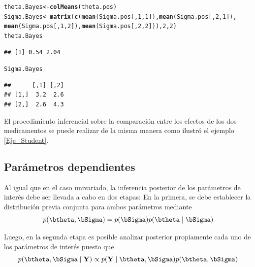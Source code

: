 \documentclass[10pt,openright]{book}\usepackage[]{graphicx}\usepackage[]{color}
\makeatletter
\newcommand{\hlnum}[1]{\textcolor[rgb]{0.686,0.059,0.569}{#1}}%
\newcommand{\hlstd}[1]{\textcolor[rgb]{0.345,0.345,0.345}{#1}}%
\newcommand{\hlkwb}[1]{\textcolor[rgb]{0.69,0.353,0.396}{#1}}%
\newcommand{\hlkwd}[1]{\textcolor[rgb]{0.737,0.353,0.396}{\textbf{#1}}}%
\newenvironment{kframe}{%
 \def\at@end@of@kframe{}%
 \ifinner\ifhmode%
  \def\at@end@of@kframe{\end{minipage}}%
  \begin{minipage}{\columnwidth}%
 \fi\fi%
 \def\FrameCommand##1{\hskip\@totalleftmargin \hskip-\fboxsep
 \colorbox{shadecolor}{##1}\hskip-\fboxsep
     \hskip-\linewidth \hskip-\@totalleftmargin \hskip\columnwidth}%
 \MakeFramed {\advance\hsize-\width
   \@totalleftmargin\z@ \linewidth\hsize
   \@setminipage}}%
 {\par\unskip\endMakeFramed%
 \at@end@of@kframe}
\newenvironment{knitrout}{}{} %
\makeatother
\begin{document}
\begin{Eje}
\begin{knitrout}
\color{fgcolor}\begin{kframe}
\begin{alltt}
\hlstd{theta.Bayes} \hlkwb{<-} \hlkwd{colMeans}\hlstd{(theta.pos)}
\hlstd{Sigma.Bayes} \hlkwb{<-} \hlkwd{matrix}\hlstd{(}\hlkwd{c}\hlstd{(}\hlkwd{mean}\hlstd{(Sigma.pos[,}\hlnum{1}\hlstd{,}\hlnum{1}\hlstd{]),} \hlkwd{mean}\hlstd{(Sigma.pos[,}\hlnum{2}\hlstd{,}\hlnum{1}\hlstd{]),}
                        \hlkwd{mean}\hlstd{(Sigma.pos[,}\hlnum{1}\hlstd{,}\hlnum{2}\hlstd{]),} \hlkwd{mean}\hlstd{(Sigma.pos[,}\hlnum{2}\hlstd{,}\hlnum{2}\hlstd{])),}\hlnum{2}\hlstd{,}\hlnum{2}\hlstd{)}
\hlstd{theta.Bayes}
\end{alltt}
\begin{verbatim}
## [1] 0.54 2.04
\end{verbatim}
\begin{alltt}
\hlstd{Sigma.Bayes}
\end{alltt}
\begin{verbatim}
##      [,1] [,2]
## [1,]  3.2  2.6
## [2,]  2.6  4.3
\end{verbatim}
\end{kframe}
\end{knitrout}
El procedimiento inferencial sobre la comparaci\'on entre los efectos de los dos medicamentos se puede realizar de la misma manera como ilustr\'o el ejemplo \ref{Eje_Student}.
\end{Eje}

\subsection{Par\'ametros dependientes}

Al igual que en el caso univariado, la inferencia posterior de los par\'ametros de inter\'es debe ser llevada a cabo en dos etapas: En la primera, se debe establecer la distribuci\'on previa conjunta para ambos par\'ametros mediante
\begin{equation*}
p(\btheta,\bSigma)=p(\bSigma)p(\btheta \mid \bSigma)
\end{equation*}

Luego, en la segunda etapa es posible analizar posterior propiamente cada uno de los par\'ametros de inter\'es puesto que
\begin{equation*}
p(\btheta,\bSigma \mid \mathbf{Y})\propto p(\mathbf{Y} \mid \btheta,\bSigma)p(\btheta,\bSigma)
\end{equation*}
\end{document}
